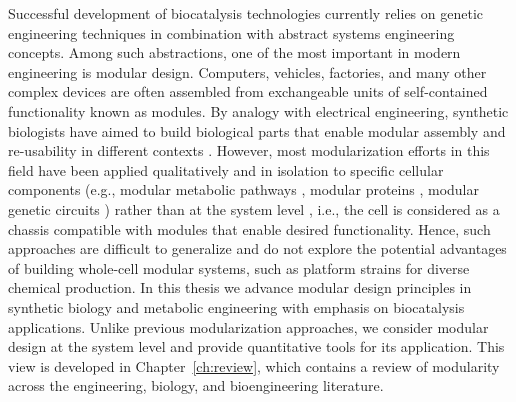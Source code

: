 Successful development of biocatalysis technologies currently relies on genetic engineering techniques in combination with abstract systems engineering concepts.
Among such abstractions, one of the most important in modern engineering is modular design.
Computers, vehicles, factories, and many other complex devices are often assembled from exchangeable units of self-contained functionality known as modules.
By analogy with electrical engineering, synthetic biologists have aimed to build biological parts that enable modular assembly and re-usability in different contexts \citep{shetty2008}.
However, most modularization efforts in this field have been applied qualitatively and in isolation to specific cellular components (e.g., modular metabolic pathways \citep{biggs2014}, modular proteins \citep{maervoet2017}, modular genetic circuits \citep{slusarczyk2012}) rather than at the system level \citep{purnick2009}, i.e., the cell is considered as a chassis compatible with modules that enable desired functionality. %
Hence, such approaches are difficult to generalize and do not explore the potential advantages of building whole-cell modular systems, such as platform strains \citep{nielsen2016} for diverse chemical production.
In this thesis we advance modular design principles in synthetic biology and metabolic engineering with emphasis on biocatalysis applications.
Unlike previous modularization approaches, we consider modular design at the system level and provide quantitative tools for its application.
This view is developed in Chapter~\ref{ch:review}, which contains a review of modularity across the engineering, biology, and bioengineering literature.


